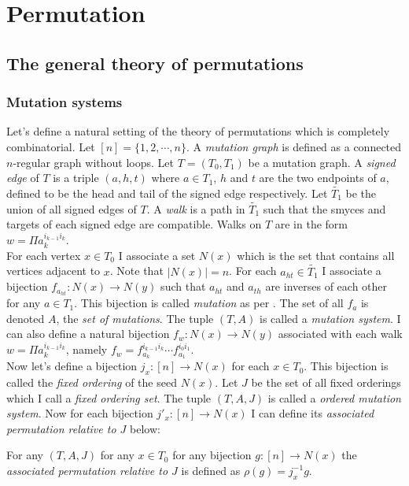 \chapter{Permutation}\label{C1}
\section{The general theory of permutations}
\subsection{Mutation systems}
\indent Let's define a natural setting of the theory of permutations which is completely combinatorial. Let $[n]=\{1,2,\cdots,n\}$.  A \textit{mutation graph} is defined as a connected $n$-regular graph without loops. Let $T=(T_0,T_1)$ be a mutation graph. A \textit{signed edge} of $T$ is a triple $(a,h,t)$ where $a\in T_1$, $h$ and $t$ are the two endpoints of $a$, defined to be the head and tail of the signed edge respectively. Let $\tilde{T_1}$ be the union of all signed edges of $T$. A \textit{walk} is a path in $\tilde{T_1}$ such that the smyces and targets of each signed edge are compatible. Walks on $T$ are in the form  $w=\Pi a_k^{i_{k-1} i_k}$.\\ 
\indent For each vertex $x\in T_0$ I associate a set $N(x)$ which is the set that contains all vertices adjacent to $x$. Note that $|N(x)|=n$. For each $a_{ht}\in\tilde{T_1}$ I associate a bijection $f_{a_{ht}}: N(x)\to N(y)$ such that $a_{ht}$ and $a_{th}$ are inverses of each other for any $a\in T_1$. This bijection is called \textit{mutation} as per \cite{FZ4}. The set of all $f_a$ is denoted $A$, the \textit{set of mutations}. The tuple $(T,A)$ is called a \textit{mutation system}. I can also define a natural bijection $f_w:N(x)\to N(y)$ associated with each walk $w=\Pi a_k^{i_{k-1} i_k}$, namely $f_w=f_{a_k}^{i_{k-1}i_k}\cdots f_{a_1}^{i_0i_1}$.\\
\indent Now let's define a bijection $j_x:[n]\to N(x)$ for each $x\in T_0$. This bijection is called the \textit{fixed ordering} of the seed $N(x)$. Let $J$ be the set of all fixed orderings which I call a \textit{fixed ordering set}. The tuple $(T,A,J)$ is called a \textit{ordered mutation system}. Now for each bijection $j'_x:[n]\to N(x)$ I can define its \textit{associated permutation relative to $J$} below:\\
\begin{definition}
For any $(T,A,J)$ for any $x\in T_0$ for any bijection $g:[n]\to N(x)$ the \textit{associated permutation relative to $J$} is defined as $\rho(g)=j_x^{-1}g$. \\
\end{definition}
